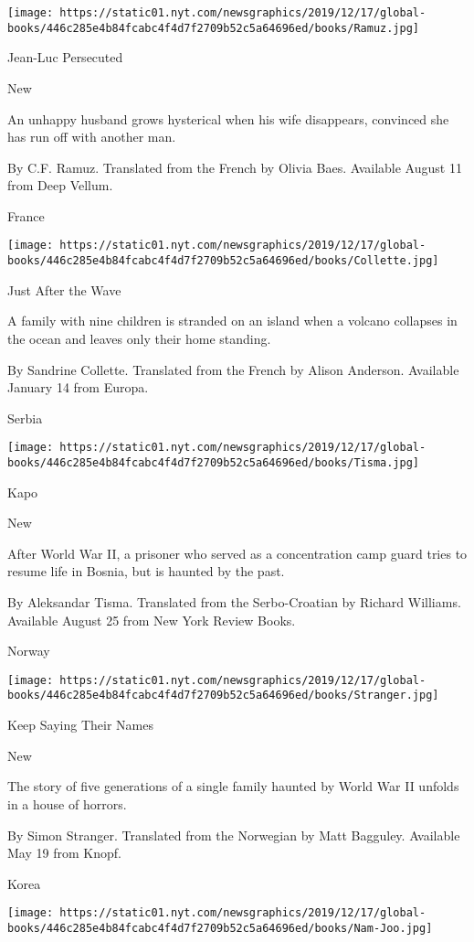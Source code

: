 \texttt{[image: https://static01.nyt.com/newsgraphics/2019/12/17/global-books/446c285e4b84fcabc4f4d7f2709b52c5a64696ed/books/Ramuz.jpg]}

Jean-Luc Persecuted

New

An unhappy husband grows hysterical when his wife disappears, convinced
she has run off with another man.

 By C.F. Ramuz. Translated from the French by Olivia Baes. Available
August 11 from Deep Vellum.

France

\texttt{[image: https://static01.nyt.com/newsgraphics/2019/12/17/global-books/446c285e4b84fcabc4f4d7f2709b52c5a64696ed/books/Collette.jpg]}

Just After the Wave

A family with nine children is stranded on an island when a volcano
collapses in the ocean and leaves only their home standing.

 By Sandrine Collette. Translated from the French by Alison Anderson.
Available January 14 from Europa.

Serbia

\texttt{[image: https://static01.nyt.com/newsgraphics/2019/12/17/global-books/446c285e4b84fcabc4f4d7f2709b52c5a64696ed/books/Tisma.jpg]}

Kapo

New

After World War II, a prisoner who served as a concentration camp guard
tries to resume life in Bosnia, but is haunted by the past.

 By Aleksandar Tisma. Translated from the Serbo-Croatian by Richard
Williams. Available August 25 from New York Review Books.

Norway

\texttt{[image: https://static01.nyt.com/newsgraphics/2019/12/17/global-books/446c285e4b84fcabc4f4d7f2709b52c5a64696ed/books/Stranger.jpg]}

Keep Saying Their Names

New

The story of five generations of a single family haunted by World War II
unfolds in a house of horrors.

 By Simon Stranger. Translated from the Norwegian by Matt Bagguley.
Available May 19 from Knopf.

Korea

\texttt{[image: https://static01.nyt.com/newsgraphics/2019/12/17/global-books/446c285e4b84fcabc4f4d7f2709b52c5a64696ed/books/Nam-Joo.jpg]}

